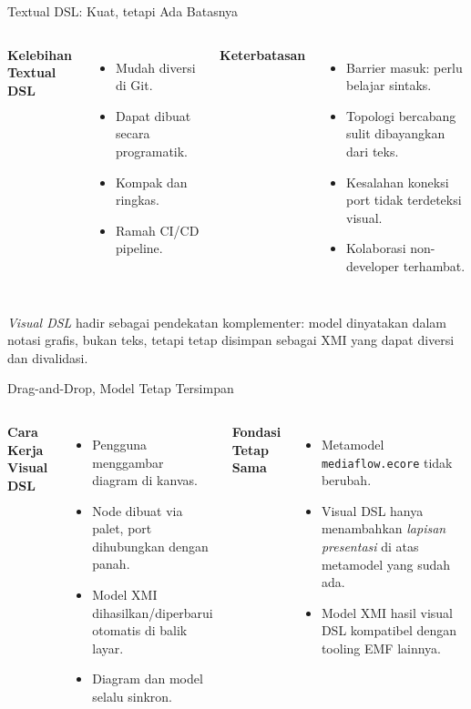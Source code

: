 \documentclass[aspectratio=169, table]{beamer}
\begin{document}
\begin{frame}{Textual DSL: Kuat, tetapi Ada Batasnya}
\vspace{6pt}
\begin{columns}[T]
\textbf{Kelebihan Textual DSL}
\begin{itemize}
  \item Mudah diversi di Git.
  \item Dapat dibuat secara programatik.
  \item Kompak dan ringkas.
  \item Ramah CI/CD pipeline.
\end{itemize}

\textbf{Keterbatasan}
\begin{itemize}
  \item Barrier masuk: perlu belajar sintaks.
  \item Topologi bercabang sulit dibayangkan dari teks.
  \item Kesalahan koneksi port tidak terdeteksi visual.
  \item Kolaborasi non-developer terhambat.
\end{itemize}
\end{columns}

\vspace{12pt}
\small
\textit{Visual DSL} hadir sebagai pendekatan komplementer: model dinyatakan dalam notasi grafis, bukan teks, tetapi tetap disimpan sebagai XMI yang dapat diversi dan divalidasi.
\end{frame}

\begin{frame}{Drag-and-Drop, Model Tetap Tersimpan}
\vspace{6pt}
\begin{columns}[T]
\textbf{Cara Kerja Visual DSL}
\begin{itemize}
  \item Pengguna menggambar diagram di kanvas.
  \item Node dibuat via palet, port dihubungkan dengan panah.
  \item Model XMI dihasilkan/diperbarui otomatis di balik layar.
  \item Diagram dan model selalu sinkron.
\end{itemize}

\textbf{Fondasi Tetap Sama}
\begin{itemize}
  \item Metamodel \texttt{mediaflow.ecore} tidak berubah.
  \item Visual DSL hanya menambahkan \textit{lapisan presentasi} di atas metamodel yang sudah ada.
  \item Model XMI hasil visual DSL kompatibel dengan tooling EMF lainnya.
\end{itemize}
\end{columns}
\end{frame}
\end{document}

